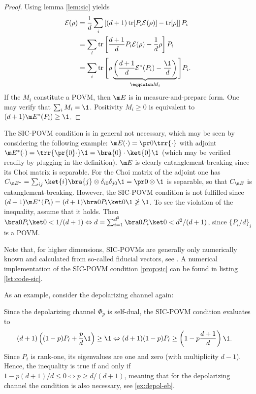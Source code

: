 \begin{proof}
    Using lemma \ref{lem:sic} yields
    \begin{align*}
\mathcal{E}(\rho) &= \frac{1}{d} \sum_i \left[ (d+1) \operatorname{tr}[P_i \mathcal{E}(\rho)] - \operatorname{tr}[\rho] \right] P_i \\
&= \sum_i \operatorname{tr} \left[ \frac{d+1}{d} P_i \mathcal{E}(\rho) - \frac{1}{d} \rho \right] P_i \\
&= \sum_i \operatorname{tr} \Bigg[ \rho \underbrace{\left( \frac{d+1}{d} \mathcal{E}^*(P_i) - \frac{\1}{d} \right)}_{\eqqcolon M_i}\Bigg] P_i.
\end{align*}
If the $M_i$ constitute a POVM, then $\m E$ is in measure-and-prepare form. One may verify that $\sum_i M_i = \1$. Positivity $M_i \geq 0$ is equivalent to $(d+1)\m E^*(P_i) \geq \1$.
\end{proof}

The SIC-POVM condition is in general not necessary, which may be seen by considering the following example: $\m E (\cdot) = \pr 0 \trr{\cdot}$ with adjoint $\m E^*(\cdot) = \trr{\pr {0} \cdot}\1 = \bra{0}\cdot \ket{0}\1$ (which may be verified readily by plugging in the definition). $\m E$ is clearly entanglement-breaking since its Choi matrix is separable. For the Choi matrix of the adjoint one has $C_{\m E^*} = \sum_{ij}\ket{i}\bra{j} \otimes \delta_{i0}\delta_{j0}\1 = \pr 0 \otimes \1$ is separable, so that $C_{\m E}$ is entanglement-breaking. However, the SIC-POVM condition is not fulfilled since $(d+1)\m E^*(P_i) = (d+1)\bra 0 P_i \ket 0 \1 \ngeq \1$. To see the violation of the inequality, assume that it holds. Then $\bra 0 P_i \ket 0 < 1/(d+1) \Leftrightarrow  d = \sum_{i=1}^{d^2}\bra 0 P_i \ket 0 < d^2/(d+1)$, since $\{P_i/d\}_i$ is a POVM.

Note that, for higher dimensions, SIC-POVMs are generally only numerically known and calculated from so-called fiducial vectors, see \cite{Scott2010, Fuchs2017}. A numerical implementation of the SIC-POVM condition \ref{prop:sic} can be found in listing \ref{lst:code-sic}. 

As an example, consider the depolarizing channel again:
\begin{ex}
Since the depolarizing channel $\Phi_p$ is self-dual, the SIC-POVM condition evaluates to
\begin{align*}
    (d+1)\left( (1-p)P_i + \frac{p}{d}\1 \right) &\geq \1 \Leftrightarrow (d+1)(1-p)P_i \geq  \left(1-p\frac{d+1}{d}\right)\1.
\end{align*}
Since $P_i$ is rank-one, its eigenvalues are one and zero (with multiplicity $d-1$). Hence, the inequality is true if and only if $1-p(d+1)/d \leq 0 \Leftrightarrow p \geq d/(d+1)$, meaning that for the depolarizing channel the condition is also necessary, see \ref{ex:depol-eb}.
\end{ex}



